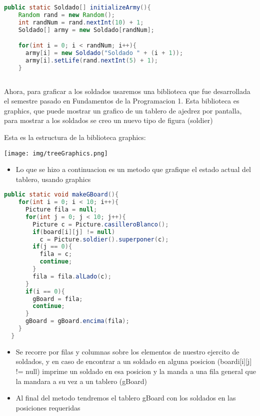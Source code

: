     \begin{lstlisting}[language=java, caption={Clase Videojuego.java}]
  public static Soldado[] initializeArmy(){
    Random rand = new Random();
    int randNum = rand.nextInt(10) + 1;
    Soldado[] army = new Soldado[randNum];

    for(int i = 0; i < randNum; i++){
      army[i] = new Soldado("Soldado " + (i + 1));
      army[i].setLife(rand.nextInt(5) + 1);
    }
    
\end{lstlisting}

Ahora, para graficar a los soldados usaremos una biblioteca que fue desarrollada el semestre pasado en Fundamentos de la Programacion 1.
 Esta biblioteca es graphics, que puede mostrar un grafico de un tablero de ajedrez por pantalla, para mostrar a los soldados se creo un nuevo tipo de figura (soldier)

 Esta es la estructura de la biblioteca graphics:

  \centering
  \texttt{[image: img/treeGraphics.png]}

  \begin{itemize}
      \item Lo que se hizo a continuacion es un metodo que grafique el estado actual del tablero, usando graphics
  \end{itemize}
      \begin{lstlisting}[language=java, caption={Clase Videojuego.java}]
  public static void makeGBoard(){
    for(int i = 0; i < 10; i++){
      Picture fila = null;
      for(int j = 0; j < 10; j++){
        Picture c = Picture.casilleroBlanco();
        if(board[i][j] != null)
          c = Picture.soldier().superponer(c);
        if(j == 0){
          fila = c;
          continue;
        }
        fila = fila.alLado(c);
      }
      if(i == 0){
        gBoard = fila;
        continue;
      }
      gBoard = gBoard.encima(fila);
    } 
  } 
\end{lstlisting}
\begin{itemize}
    \item Se recorre por filas y columnas sobre los elementos de nuestro ejercito de soldados, y en caso de encontrar a un soldado en alguna posicion (boardi[i][j] != null) imprime un soldado en esa posicion y la manda a una fila general que la mandara a su vez a un tablero (gBoard)
    \item Al final del metodo tendremos el tablero gBoard con los soldados en las posiciones requeridas
\end{itemize}

